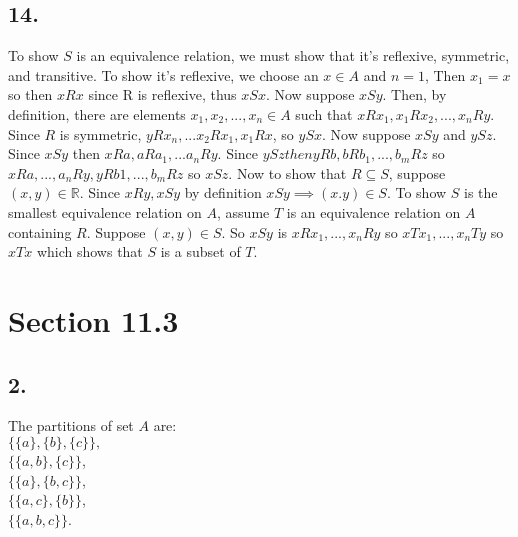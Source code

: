 \documentclass[12pt]{article}
\begin{document}
\begin{minipage}[t]{0.45\textwidth}

\subsection*{14.}
To show $ S $ is an equivalence relation, we must show that it's reflexive, symmetric, and transitive. To show it's reflexive, we choose an $ x\in A $ and $ n=1 $, Then $ x_1=x $ so then $ xRx $ since R is reflexive, thus $ xSx $. Now suppose $ xSy $. Then, by definition, there are elements $ x_1, x_2,...,x_n\in A$ such that $ xRx_1, x_1Rx_2,...,x_nRy $. Since $ R $ is symmetric, $ yRx_n,... x_2Rx_1, x_1Rx $, so $ ySx $. Now suppose $ xSy $ and $ ySz $. Since $ xSy $ then $ xRa, aRa_1,...a_nRy$. Since $ ySz then yRb, bRb_1,...,b_mRz $ so $ xRa,...,a_nRy,yRb1,...,b_mRz $ so $ xSz $. Now to show that $ R\subseteq S$, suppose $ (x,y)\in\mathbb{R} $. Since $ xRy, xSy $ by definition $ xSy\implies(x.y)\in S $. To show $ S $ is the smallest equivalence relation on $ A $, assume $ T $ is an equivalence relation on $ A $ containing $ R $. Suppose $ (x,y)\in S $. So $ xSy $ is $ xRx_1,...,x_nRy $ so $ xTx_1,...,x_nTy $ so $ xTx $ which shows that $ S $ is a subset of $ T $.

\section*{Section 11.3}
\subsection*{2.}
The partitions of set $ A $ are:\\
$ \{\{a\}, \{b\}, \{c\}\}, $\\
$ \{\{a,b\},\{c\}\} $,\\
$ \{\{a\},\{b,c\}\} $,\\
$ \{\{a,c\},\{b\}\} $,\\
$ \{\{a,b,c\}\} $.

\end{minipage}
\pagebreak


\end{document}
